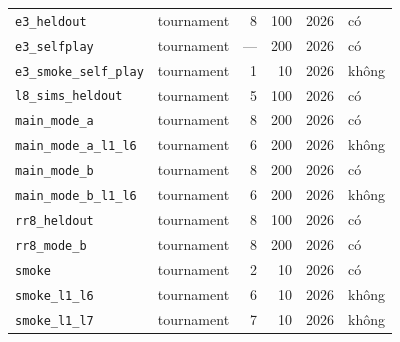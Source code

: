 {\begin{longtable}{llrrrl}
    \texttt{e3\_heldout} & tournament & 8 & 100 & 2026 & có \\
    \texttt{e3\_selfplay} & tournament & --- & 200 & 2026 & có \\
    \texttt{e3\_smoke\_self\_play} & tournament & 1 & 10 & 2026 & không \\
    \texttt{l8\_sims\_heldout} & tournament & 5 & 100 & 2026 & có \\
    \texttt{main\_mode\_a} & tournament & 8 & 200 & 2026 & có \\
    \texttt{main\_mode\_a\_l1\_l6} & tournament & 6 & 200 & 2026 & không \\
    \texttt{main\_mode\_b} & tournament & 8 & 200 & 2026 & có \\
    \texttt{main\_mode\_b\_l1\_l6} & tournament & 6 & 200 & 2026 & không \\
    \texttt{rr8\_heldout} & tournament & 8 & 100 & 2026 & có \\
    \texttt{rr8\_mode\_b} & tournament & 8 & 200 & 2026 & có \\
    \texttt{smoke} & tournament & 2 & 10 & 2026 & có \\
    \texttt{smoke\_l1\_l6} & tournament & 6 & 10 & 2026 & không \\
    \texttt{smoke\_l1\_l7} & tournament & 7 & 10 & 2026 & không \\
\end{longtable}
}
